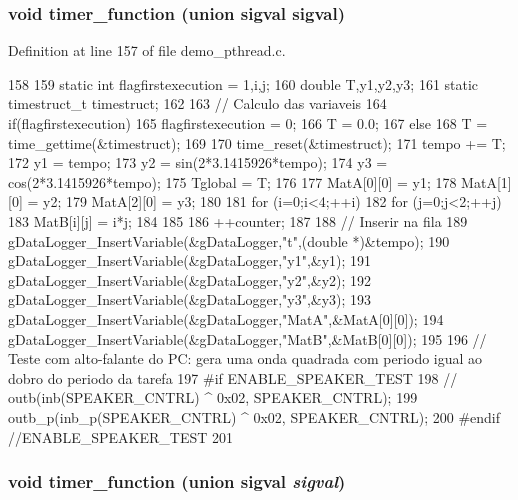 \subsubsection[{timer\_\-function}]{\setlength{\rightskip}{0pt plus 5cm}void timer\_\-function (union sigval sigval)}\label{demo__pthread_8c_a508e15cd92f2efa357312012ea5e478e}


Definition at line 157 of file demo\_\-pthread.c.


\begin{DoxyCode}
158 { 
159         static int flagfirstexecution = 1,i,j;
160         double T,y1,y2,y3;
161         static timestruct_t timestruct;
162 
163         // Calculo das variaveis
164         if(flagfirstexecution){
165                 flagfirstexecution = 0;
166                 T = 0.0;
167         } else {
168                 T = time_gettime(&timestruct);
169         }
170         time_reset(&timestruct);
171         tempo += T;
172         y1 = tempo;
173         y2 = sin(2*3.1415926*tempo);
174         y3 = cos(2*3.1415926*tempo);
175         Tglobal = T;
176 
177         MatA[0][0] = y1;
178         MatA[1][0] = y2;
179         MatA[2][0] = y3;
180 
181         for (i=0;i<4;++i){
182                 for (j=0;j<2;++j){
183                         MatB[i][j] = i*j;
184                 }
185         }
186         ++counter;
187 
188         // Inserir na fila
189         gDataLogger_InsertVariable(&gDataLogger,"t",(double *)&tempo);
190         gDataLogger_InsertVariable(&gDataLogger,"y1",&y1);
191         gDataLogger_InsertVariable(&gDataLogger,"y2",&y2);
192         gDataLogger_InsertVariable(&gDataLogger,"y3",&y3);
193         gDataLogger_InsertVariable(&gDataLogger,"MatA",&MatA[0][0]);
194         gDataLogger_InsertVariable(&gDataLogger,"MatB",&MatB[0][0]);
195 
196         // Teste com alto-falante do PC: gera uma onda quadrada com periodo igual
       ao dobro do periodo da tarefa
197 #if ENABLE_SPEAKER_TEST
198 //      outb(inb(SPEAKER_CNTRL) ^ 0x02, SPEAKER_CNTRL);
199         outb_p(inb_p(SPEAKER_CNTRL) ^ 0x02, SPEAKER_CNTRL);
200 #endif //ENABLE_SPEAKER_TEST
201 }
\end{DoxyCode}
\subsubsection[{timer\_\-function}]{\setlength{\rightskip}{0pt plus 5cm}void timer\_\-function (union sigval {\em sigval})}\label{demo__pthread_8c_a508e15cd92f2efa357312012ea5e478e}


